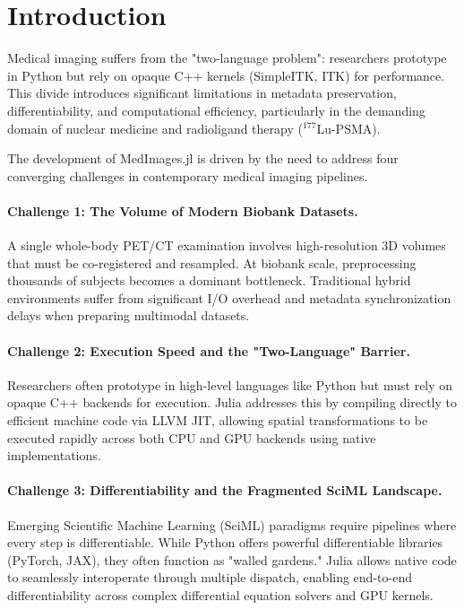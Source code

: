 \documentclass[10pt,letterpaper]{article}
\begin{document}
\section{Introduction}
Medical imaging suffers from the "two-language problem": researchers prototype in Python but rely on opaque C++ kernels (SimpleITK, ITK) for performance. This divide introduces significant limitations in metadata preservation, differentiability, and computational efficiency, particularly in the demanding domain of nuclear medicine and radioligand therapy ($^{177}$Lu-PSMA).

The development of MedImages.jl is driven by the need to address four converging challenges in contemporary medical imaging pipelines.

\paragraph{Challenge 1: The Volume of Modern Biobank Datasets.}
A single whole-body PET/CT examination involves high-resolution 3D volumes that must be co-registered and resampled. At biobank scale, preprocessing thousands of subjects becomes a dominant bottleneck. Traditional hybrid environments suffer from significant I/O overhead and metadata synchronization delays when preparing multimodal datasets.

\paragraph{Challenge 2: Execution Speed and the "Two-Language" Barrier.}
Researchers often prototype in high-level languages like Python but must rely on opaque C++ backends for execution. Julia addresses this by compiling directly to efficient machine code via LLVM JIT, allowing spatial transformations to be executed rapidly across both CPU and GPU backends using native implementations.

\paragraph{Challenge 3: Differentiability and the Fragmented SciML Landscape.}
Emerging Scientific Machine Learning (SciML) paradigms require pipelines where every step is differentiable. While Python offers powerful differentiable libraries (PyTorch, JAX), they often function as "walled gardens." Julia allows native code to seamlessly interoperate through multiple dispatch, enabling end-to-end differentiability across complex differential equation solvers and GPU kernels.
\end{document}
